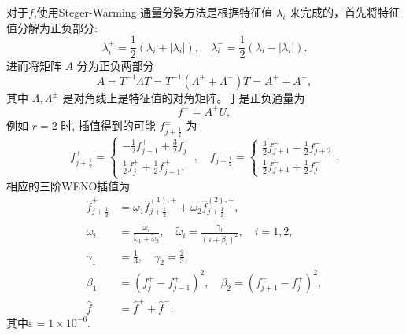 \documentclass[12pt]{article}
\begin{document}
对于$f$,使用Steger-Warming 通量分裂方法是根据特征值 $\lambda_{i}$ 来完成的，首先将特征值分解为正负部分:
\begin{equation}
	\lambda_{i}^{+}=\frac{1}{2}\left(\lambda_{i}+\left|\lambda_{i}\right|\right), \quad \lambda_{i}^{-}=\frac{1}{2}\left(\lambda_{i}-\left|\lambda_{i}\right|\right) .
\end{equation}
进而将矩阵 $A$ 分为正负两部分
\begin{equation}
	A=T^{-1} \Lambda T=T^{-1}\left(\Lambda^{+}+\Lambda^{-}\right) T=A^{+}+A^{-},
\end{equation}
其中 $\Lambda, \Lambda^{\pm}$ 是对角线上是特征值的对角矩阵。于是正负通量为
\begin{equation}
	f^{+}=A^{+} U,
\end{equation}
例如 $r=2$ 时, 插值得到的可能 $f_{j+\frac{1}{2}}^{\pm}$ 为
\begin{equation}
	f_{j+\frac{1}{2}}^{+}=\left\{\begin{array}{l}
		-\frac{1}{2} f_{j-1}^{+}+\frac{3}{2} f_{j}^{+} \\
		\frac{1}{2} f_{j}^{+}+\frac{1}{2} f_{j+1}^{+},
	\end{array}, \quad f_{j+\frac{1}{2}}^{-}=\left\{\begin{array}{l}
		\frac{3}{2} f_{j+1}^{-}-\frac{1}{2} f_{j+2}^{-} \\
		\frac{1}{2} f_{j+1}^{-}+\frac{1}{2} f_{j}^{-}
	\end{array}\right.\right..
\end{equation}
相应的三阶WENO插值为
\begin{align}
	\hat{f}_{j+\frac{1}{2}}^{+} & =\omega_{1} \hat{f}_{j+\frac{1}{2}}^{(1),+}+\omega_{2} \hat{f}_{j+\frac{1}{2}}^{(2),+}                 ,                                                                            \\
	\omega_{i}                  & =\frac{\widetilde{\omega}_{i}}{\widetilde{\omega}_{1}+\widetilde{\omega}_{2}}, \quad \widetilde{\omega}_{i}=\frac{\gamma_{l}}{\left(\varepsilon+\beta_{i}\right)^{2}}, \quad i=1,2, \\
	\gamma_{1}                  & =\frac{1}{3}, \quad \gamma_{2}=\frac{2}{3},                                                                                                                                         \\
	\beta_{1}                   & =\left(f_{j}^{+}-f_{j-1}^{+}\right)^{2}, \quad \beta_{2}=\left(f_{j+1}^{+}-f_{j}^{+}\right)^{2},                                                                                    \\
	\hat{f}                     & =\hat{f}^+ + \hat{f}^-.
\end{align}
其中$\varepsilon = 1\times 10^{-6}$.
\end{document}
